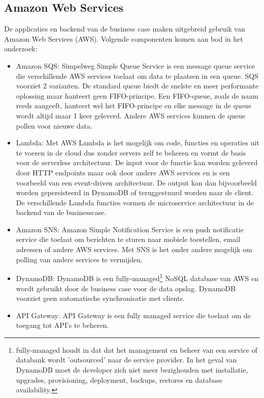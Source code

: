 \subsection{Amazon Web Services}
De applicaties en backend van de business case maken uitgebreid gebruik van Amazon Web Services (AWS). Volgende componenten komen aan bod in het onderzoek:
\begin{itemize}
\item Amazon SQS: Simpelweg Simple Queue Service is een message queue service die verschillende AWS services toelaat om data te plaatsen in een queue. SQS voorziet 2 varianten. De standard queue biedt de snelste en meer performante oplossing maar hanteert geen FIFO-principe. Een FIFO-queue, zoals de naam reeds aangeeft, hanteert wel het FIFO-principe en elke message in de queue wordt altijd maar 1 keer geleverd. Andere AWS services kunnen de queue pollen voor nieuwe data.
\item Lambda: Met AWS Lambda is het mogelijk om code, functies en operaties uit te voeren in de cloud dus zonder servers zelf te beheren en vormt de basis voor de serverless architectuur. De input voor de functie kan worden geleverd door HTTP endpoints maar ook door andere AWS services en is een voorbeeld van een event-driven architectuur. De output kan dan bijvoorbeeld worden gepersisteerd in DynamoDB of teruggestuurd worden naar de client. De verschillende Lambda functies vormen de microservice architectuur in de backend van de businesscase.
\item Amazon SNS: Amazon Simple Notification Service is een push notificatie service die toelaat om berichten te sturen naar mobiele toestellen, email adressen of andere AWS services. Met SNS is het onder andere mogelijk om polling van andere services te vermijden.
\item DynamoDB: DynamoDB is een fully-managed\footnote{fully-managed houdt in dat dat het management en beheer van een service of databank wordt 'outsourced' naar de service provider. In het geval van DynamoDB moet de developer zich niet meer bezighouden met installatie, upgrades, provisioning, deployment, backups, restores en database availability.} NoSQL database van AWS en wordt gebruikt door de business case voor de data opslag. DynamoDB voorziet geen automatische synchronisatie met clients.
\item API Gateway: API Gateway is een fully managed service die toelaat om de toegang tot API's te beheren.
\end{itemize}
